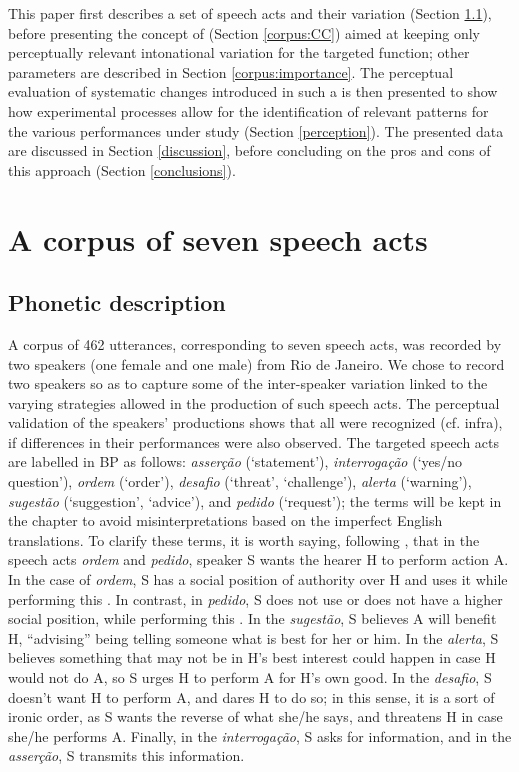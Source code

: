 \documentclass[output=paper]{LSP/langsci}
\begin{document}
This paper first describes a set of speech acts and their  variation (Section \ref{corpus:phonetic}), before presenting the concept of  (Section \ref{corpus:CC}) aimed at keeping only perceptually relevant intonational variation for the targeted function; other  parameters are described in Section \ref{corpus:importance}. The perceptual evaluation of  systematic changes introduced in such a  is then presented to show how experimental processes allow for the identification of relevant patterns for the various  performances under study (Section \ref{perception}). The presented data are discussed in Section \ref{discussion}, before concluding on the pros and cons of this approach (Section \ref{conclusions}).


\section{A corpus of seven speech acts}
\label{corpus}
\subsection{Phonetic description}
\label{corpus:phonetic}

A corpus of 462 utterances, corresponding to seven speech acts, was recorded by two  speakers (one female and one male) from Rio de Janeiro. 
We chose to record two speakers so as to capture some of the inter-speaker variation linked to the varying strategies allowed in the production of such speech acts. 
The perceptual validation of the speakers' productions shows that all were recognized (cf. infra), if differences in their performances were also observed.
The targeted speech acts are labelled in BP as follows: \textit{asserção} (`statement'), \textit{interrogação} (`yes/no question'), \textit{ordem} (`order'), \textit{desafio} (`threat', `challenge'), \textit{alerta} (`warning'), \textit{sugestão} (`suggestion', `advice'), and \textit{pedido} (`request'); the  terms will be kept in the chapter to avoid misinterpretations based on the imperfect English translations. 
To clarify these terms, it is worth saying, following \citet{Searle1979}, that in the speech acts \textit{ordem} and \textit{pedido}, speaker S wants the hearer H to perform action A. 
In the case of \textit{ordem}, S has a social position of authority over H and uses it while performing this . 
In contrast, in \textit{pedido}, S does not use or does not have a higher social position, while performing this . 
In the \textit{sugestão}, S believes A will benefit H, ``advising'' being telling someone what is best for her or him. 
In the \textit{alerta}, S believes something that may not be in H's best interest could happen in case H would not do A, so S urges H to perform A for H's own good.
In the \textit{desafio}, S doesn't want H to perform A, and dares H to do so; in this sense, it is a sort of ironic order, as S wants the reverse of what she/he says, and threatens H in case she/he performs A. 
Finally, in the \textit{interrogação}, S asks for information, and in the \textit{asserção}, S transmits this information.
\end{document}
